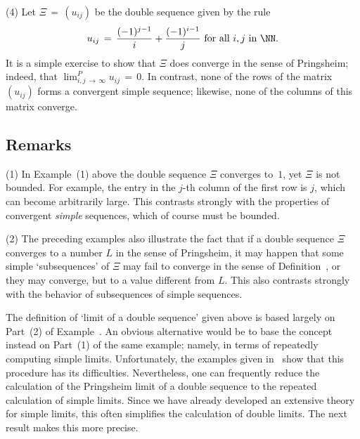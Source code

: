 {\V

        (4) Let ${\Xi} \,=\, (u_{ij})$ be the double sequence given by the rule
        \begin{displaymath}
        u_{ij} \,=\, \frac{(-1)^{j-1}}{i} + \frac{(-1)^{i-1}}{j} \mbox{ for all $i,j$ in ${\NN}$}.
        \end{displaymath}
    It is a simple exercise to show that ${\Xi}$ does converge in the sense of Pringsheim;
    indeed, that $\lim_{i,j \,{\rightarrow}\, {\infty}}^{P} u_{ij} \,=\, 0$.
    In contrast, none of the rows of the matrix $(u_{ij})$ forms a convergent simple sequence; likewise, none of the columns of this matrix converge.

\V
\V

            \subsection{\small{\bf Remarks}}
            \label{RemrkC100.120}

\V

\hspace*{\parindent}
        (1) In Example~(1) above the double sequence ${\Xi}$ converges to~$1$, yet ${\Xi}$ is not bounded.
    For example, the entry in the $j$-th column of the first row is $j$, which can become arbitrarily large.
    This contrasts strongly with the properties of convergent {\em simple} sequences, which of course must be bounded.

\V

        (2) The preceding examples also illustrate the fact that if a double sequence ${\Xi}$ converges to a number $L$ in the sense of Pringsheim,
    it may happen that some simple `subsequences' of ${\Xi}$ may fail to converge in the sense of Definition~,
    or they may converge, but to a value different from $L$.
    This also contrasts strongly with the behavior of subsequences of simple sequences.

\V
\V


        The definition of `limit of a double sequence' given above is based largely on Part~(2) of Example~.
    An obvious alternative would be to base the concept instead on Part~(1) of the same example;
    namely, in terms of repeatedly computing simple limits.
    Unfortunately, the examples given in~ show that this procedure has its difficulties.
    Nevertheless, one can frequently reduce the calculation of the Pringsheim limit of a double sequence to the repeated calculation of simple limits.
    Since we have already developed an extensive theory for simple limits, this often simplifies the calculation of double limits. 
    The next result makes this more precise.

}
